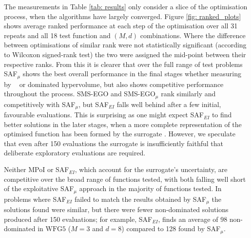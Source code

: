 \documentclass[conference]{IEEEtran}
\newcommand{\ndim}{d}
\newcommand{\nobj}{M}
\DeclareMathOperator*{\igdp}{IGD^{+}}
\newcommand\hpv{dominated hypervolume\xspace}
\newcommand\safmu{SAF$_{\mu}$\xspace}
\newcommand\safei{SAF$_{EI}$\xspace}
\newcommand\smsego{SMS-EGO\xspace}
\newcommand\smsegomu{SMS-EGO$_{\mu}$\xspace}
\newcommand\mpoi{MPoI\xspace}
\begin{document}
The measurements in Table \ref{tab: results} only consider a slice of the optimisation process, when the algorithms have largely converged. Figure \ref{fig: ranked_plots} shows average ranked performance at each step of the optimisation  over all 31 repeats and all 18 test function and $(\nobj, \ndim)$ combinations. Where the difference between optimisations of similar rank were not statistically significant (according to Wilcoxon signed-rank test) the two were assigned the mid-point between their respective ranks. From this it is  clearer that over the full  range of test problems \safmu shows the  best overall performance in the final stages whether measuring by $\igdp$ or \hpv, but also shows competitive performance throughout the process. \smsego and \smsegomu rank similarly and competitively with \safmu, but \safei falls well behind after a few initial, favourable evaluations. This is surprising as one might expect \safei to find better solutions in the later stages, when a more complete representation of the optimised function has been formed by the surrogate \cite{death2019greed}. However, we speculate that even after 150 evaluations the surrogate is insufficiently faithful that deliberate exploratory evaluations are required. 

Neither \mpoi or \safei, which account for the surrogate's uncertainty, are competitive over the broad range of functions tested, with both falling well short of the exploitative \safmu approach in the majority of functions tested. In problems where \safei failed to match the results obtained by \safmu the solutions found were similar, but there were fewer non-dominated solutions produced after 150 evaluations; for example, \safei, finds an average of 98 non-dominated in $\text{WFG}5$ ($\nobj = 3$ and $\ndim = 8$) compared to 128 found by \safmu.
\end{document}
